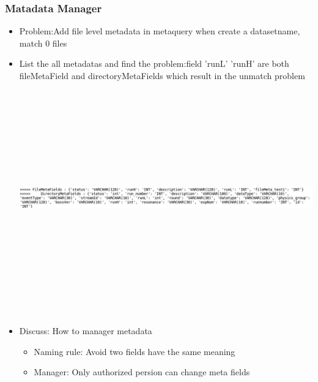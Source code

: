 \documentclass{beamer}
\begin{document}
\begin{frame}
  \frametitle{Matadata Manager}
  \begin{itemize}
    \item Problem:Add file level metadata in metaquery when create a datasetname, match 0 files
    \item List the all metadatas and find the problem:field 'runL' 'runH' are both fileMetaField and directoryMetaFields which
      result in the unmatch problem
  \hspace{0.5cm} 
  \includegraphics[height=10cm,width=15cm,keepaspectratio]{data/metaShow.png}
    \item Discuss: How to manager metadata
      \begin{itemize}
        \item Naming rule: Avoid two fields have the same meaning
        \item Manager: Only authorized persion can change meta fields
      \end{itemize}
  \end{itemize}
\end{frame}
\end{document}
